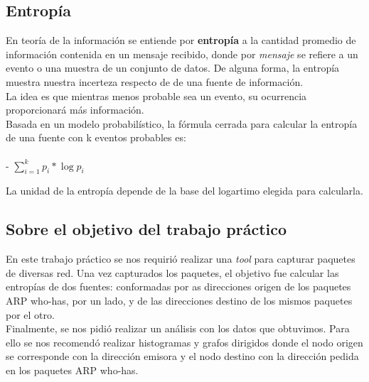\subsection{Entropía}

\indent \indent En teoría de la información se entiende por \textbf{entropía} a la cantidad promedio de información contenida en un mensaje recibido, donde por \textit{mensaje} se refiere a un evento o una muestra de un conjunto de datos. De alguna forma, la entropía muestra nuestra incerteza respecto de de una fuente de información.\\
\indent La idea es que mientras menos probable sea un evento, su ocurrencia proporcionará más información.\\
\indent Basada en un modelo probabilístico, la fórmula cerrada para calcular la entropía de una fuente con k eventos probables es:\\
\\
\indent \indent \indent \indent \indent \indent \indent \indent \indent \indent - $\sum \limits_{i=1}^k p_i * \log{p_i}$ \newline

\indent La unidad de la entropía depende de la base del logartimo elegida para calcularla.\\

\subsection{Sobre el objetivo del trabajo práctico}

\indent \indent En este trabajo práctico se nos requirió realizar una \textit{tool} para capturar paquetes de diversas red. Una vez capturados los paquetes, el objetivo fue calcular las entropías de dos fuentes: conformadas por as direcciones origen de los paquetes ARP who-has, por un lado, y de las direcciones destino de los mismos paquetes por el otro.\\
\indent Finalmente, se nos pidió realizar un análisis con los datos que obtuvimos. Para ello se nos recomendó realizar histogramas y grafos dirigidos donde el nodo origen se corresponde con la dirección emisora y el nodo destino con la dirección pedida en los paquetes ARP who-has.